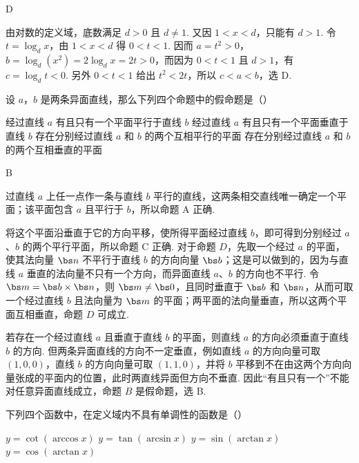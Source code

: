\begin{answer}
D
\end{answer}

\begin{solution}
由对数的定义域，底数满足 \(d>0\) 且 \(d\ne1\). 又因 \(1<x<d\)，只能有 \(d>1\). 令 \(t=\log_d x\)，由 \(1<x<d\) 得 \(0<t<1\). 因而
\(a=t^2>0\)，\(b=\log_d\left(x^2\right)=2\log_d x=2t>0\)，而因为 \(0<t<1\) 且 \(d>1\)，有 \(c=\log_d t<0\). 另外 \(0<t<1\) 给出 \(t^2<2t\)，所以 \(c<a<b\)，选 D.
\end{solution}

\begin{problem}
设 \(a\)，\(b\) 是两条异面直线，那么下列四个命题中的假命题是（\quad）

\choices
    {经过直线 \(a\) 有且只有一个平面平行于直线 \(b\)}
    {经过直线 \(a\) 有且只有一个平面垂直于直线 \(b\)}
    {存在分别经过直线 \(a\) 和 \(b\) 的两个互相平行的平面}
    {存在分别经过直线 \(a\) 和 \(b\) 的两个互相垂直的平面}
\end{problem}

\begin{answer}
B
\end{answer}

\begin{solution}
过直线 \(a\) 上任一点作一条与直线 \(b\) 平行的直线，这两条相交直线唯一确定一个平面；该平面包含 \(a\) 且平行于 \(b\)，所以命题 A 正确.

将这个平面沿垂直于它的方向平移，使所得平面经过直线 \(b\)，即可得到分别经过 \(a\)、\(b\) 的两个平行平面，所以命题 C 正确. 对于命题 \(D\)，先取一个经过 \(a\) 的平面，使其法向量 \(\bs n\) 不平行于直线 \(b\) 的方向向量 \(\bs b\)；这是可以做到的，因为与直线 \(a\) 垂直的法向量不只有一个方向，而异面直线 \(a\)、\(b\) 的方向也不平行. 令 \(\bs m=\bs b\times\bs n\)，则 \(\bs m\ne\bs 0\)，且同时垂直于 \(\bs b\) 和 \(\bs n\)，从而可取一个经过直线 \(b\) 且法向量为 \(\bs m\) 的平面；两平面的法向量垂直，所以这两个平面互相垂直，命题 \(D\) 可成立.

若存在一个经过直线 \(a\) 且垂直于直线 \(b\) 的平面，则直线 \(a\) 的方向必须垂直于直线 \(b\) 的方向. 但两条异面直线的方向不一定垂直，例如直线 \(a\) 的方向向量可取 \((1,0,0)\)，直线 \(b\) 的方向向量可取 \((1,1,0)\)，并将 \(b\) 平移到不在由这两个方向向量张成的平面内的位置，此时两直线异面但方向不垂直. 因此“有且只有一个”不能对任意异面直线成立，命题 \(B\) 是假命题，选 B.
\end{solution}

\begin{problem}
下列四个函数中，在定义域内不具有单调性的函数是（\quad）

\choices
    {\(y=\cot\left(\arccos x\right)\)}
    {\(y=\tan\left(\arcsin x\right)\)}
    {\(y=\sin\left(\arctan x\right)\)}
    {\(y=\cos\left(\arctan x\right)\)}
\end{problem}

